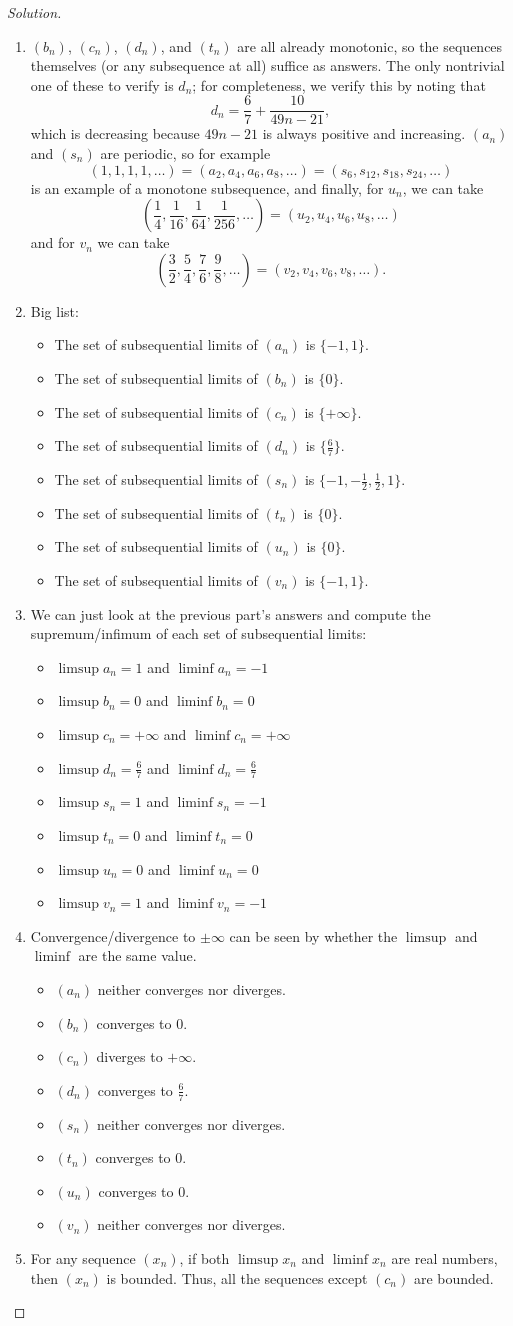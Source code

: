 \documentclass[11pt]{scrartcl}
\providecommand{\ii}{\item}
\theoremstyle{problem}
\theoremstyle{remark}
\newenvironment{soln}{\begin{proof}[Solution]}{\end{proof}}
\begin{document}
\begin{soln}
\begin{enumerate}[\textbf{(\alph*)}]
	\ii $(b_n)$, $(c_n)$, $(d_n)$, and $(t_n)$ are all already monotonic,
	so the sequences themselves (or any subsequence at all) suffice as answers.
	The only nontrivial one of these to verify is $d_n$;
	for completeness, we verify this by noting that
	\[d_n = \frac{6}{7} + \frac{10}{49n-21},\]
	which is decreasing because $49n-21$ is always positive and increasing.
	$(a_n)$ and $(s_n)$ are periodic, so for example
	\[(1, 1, 1, 1, \dots) = (a_2, a_4, a_6, a_8, \dots) =
	(s_6, s_{12}, s_{18}, s_{24}, \dots)\]
	is an example of a monotone subsequence,
	and finally, for $u_n$, we can take
	\[\left(\frac14, \frac1{16}, \frac1{64}, \frac1{256}, \dots\right)
	= (u_2, u_4, u_6, u_8, \dots)\]
	and for $v_n$ we can take
	\[\left(\frac{3}{2}, \frac{5}{4}, \frac76, \frac98, \dots\right)
	= (v_2, v_4, v_6, v_8, \dots).\]
	\ii Big list:
	\begin{itemize}
		\ii The set of subsequential limits of $(a_n)$ is $\{-1, 1\}$.
		\ii The set of subsequential limits of $(b_n)$ is $\{0\}$.
		\ii The set of subsequential limits of $(c_n)$ is $\{+\infty\}$.
		\ii The set of subsequential limits of $(d_n)$ is $\{\frac67\}$.
		\ii The set of subsequential limits of $(s_n)$ is
		$\{-1, -\frac12, \frac12, 1\}$.
		\ii The set of subsequential limits of $(t_n)$ is $\{0\}$.
		\ii The set of subsequential limits of $(u_n)$ is $\{0\}$.
		\ii The set of subsequential limits of $(v_n)$ is $\{-1, 1\}$.
	\end{itemize}
	\ii We can just look at the previous part's answers and compute
	the supremum/infimum of each set of subsequential limits:
	\begin{itemize}
		\ii $\limsup a_n = 1$ and $\liminf a_n = -1$
		\ii $\limsup b_n = 0$ and $\liminf b_n = 0$
		\ii $\limsup c_n = +\infty$ and $\liminf c_n = +\infty$
		\ii $\limsup d_n = \frac67$ and $\liminf d_n = \frac67$
		\ii $\limsup s_n = 1$ and $\liminf s_n = -1$
		\ii $\limsup t_n = 0$ and $\liminf t_n = 0$
		\ii $\limsup u_n = 0$ and $\liminf u_n = 0$
		\ii $\limsup v_n = 1$ and $\liminf v_n = -1$
	\end{itemize}
	\ii Convergence/divergence to $\pm\infty$
	can be seen by whether the $\limsup$ and $\liminf$ are the same value.
	\begin{itemize}
		\ii $(a_n)$ neither converges nor diverges.
		\ii $(b_n)$ converges to $0$.
		\ii $(c_n)$ diverges to $+\infty$.
		\ii $(d_n)$ converges to $\frac67$.
		\ii $(s_n)$ neither converges nor diverges.
		\ii $(t_n)$ converges to $0$.
		\ii $(u_n)$ converges to $0$.
		\ii $(v_n)$ neither converges nor diverges.
	\end{itemize}
	\ii For any sequence $(x_n)$,
	if both $\limsup x_n$ and $\liminf x_n$ are real numbers,
	then $(x_n)$ is bounded.
	Thus, all the sequences except $(c_n)$ are bounded.
\end{enumerate}
\end{soln}
\end{document}
